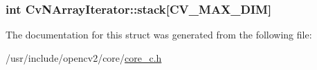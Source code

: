 \hypertarget{structCvNArrayIterator_a58989ed0ecfcd9f6cef660591535e99e}{
\subsubsection[{stack}]{\setlength{\rightskip}{0pt plus 5cm}int Cv\-N\-Array\-Iterator\-::stack\mbox{[}{\bf C\-V\-\_\-\-M\-A\-X\-\_\-\-D\-I\-M}\mbox{]}}}\label{structCvNArrayIterator_a58989ed0ecfcd9f6cef660591535e99e}


The documentation for this struct was generated from the following file\-:\begin{DoxyCompactItemize}
\item 
/usr/include/opencv2/core/\hyperlink{core__c_8h}{core\-\_\-c.\-h}\end{DoxyCompactItemize}
